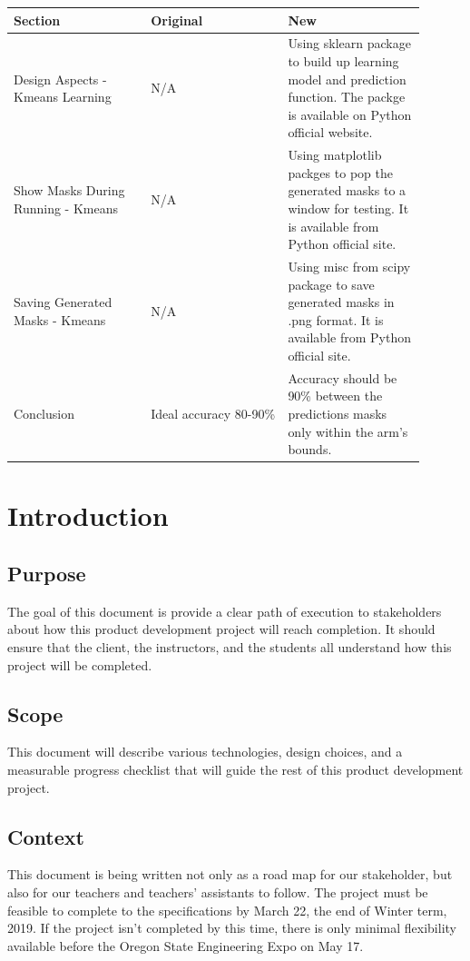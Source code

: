 \documentclass[10pt,journal,compsoc, draftclsnofoot,onecolumn]{IEEEtran}
\begin{document}
\begin{center}
 \begin{tabular}{|p{0.3\linewidth}|p{0.3\linewidth}|p{0.3\linewidth}|}
  \hline
 Section & Original & New \\ [0.5ex]
 \hline\hline

Design Aspects - Kmeans Learning
&
N/A
&
Using sklearn package to build up learning model and prediction function. The packge is available on Python official website.
\\ \hline

Show Masks During Running - Kmeans
&
N/A
&
Using matplotlib packges to pop the generated masks to a window for testing. It is available from Python official site.
\\ \hline

Saving Generated Masks - Kmeans
&
N/A
&
Using misc from scipy package to save generated masks in .png format. It is available from Python official site.
\\ \hline



Conclusion
&
Ideal accuracy 80-90\%
&
Accuracy should be 90\% between the predictions masks only within the arm's bounds.
\\ \hline
 
 \end{tabular}
\end{center}
\pagebreak

\section{Introduction}
\subsection{Purpose}
The goal of this document is provide a clear path of execution to stakeholders about how this product development project will reach completion.
It should ensure that the client, the instructors, and the students all understand how this project will be completed.

\subsection{Scope}
This document will describe various technologies, design choices, and a measurable progress checklist that will guide the rest of this product development project.

\subsection{Context}
This document is being written not only as a road map for our stakeholder, but also for our teachers and teachers' assistants to follow.
The project must be feasible to complete to the specifications by March 22, the end of Winter term, 2019.
If the project isn't completed by this time, there is only minimal flexibility available before the Oregon State Engineering Expo on May 17.
\end{document}
